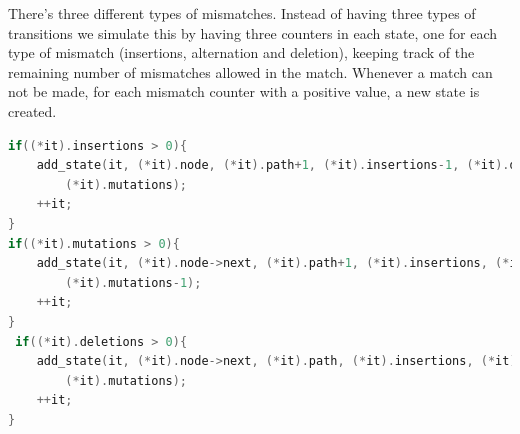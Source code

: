 There's three different types of mismatches. Instead of having three types of transitions we simulate this by having three counters in each state, one for each type of mismatch (insertions, alternation and deletion), keeping track of the remaining number of mismatches allowed in the match. Whenever a match can not be made, for each mismatch counter with a positive value, a new state is created.


\begin{lstlisting}[language=C++]
if((*it).insertions > 0){
    add_state(it, (*it).node, (*it).path+1, (*it).insertions-1, (*it).deletions, 
        (*it).mutations);
    ++it;
}
if((*it).mutations > 0){
    add_state(it, (*it).node->next, (*it).path+1, (*it).insertions, (*it).deletions,
        (*it).mutations-1);
    ++it;
}
 if((*it).deletions > 0){
    add_state(it, (*it).node->next, (*it).path, (*it).insertions, (*it).deletions-1,
        (*it).mutations);
    ++it;
}
\end{lstlisting}

